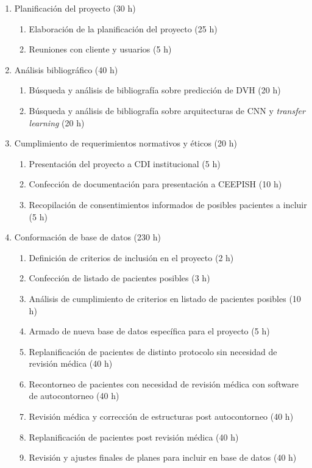 \documentclass[
11pt, %
codirector, %
]{charter}
\begin{document}
\begin{enumerate}
\item Planificación del proyecto (30 h)
	\begin{enumerate}
	\item Elaboración de la planificación del proyecto (25 h)
	\item Reuniones con cliente y usuarios (5 h)
	\end{enumerate}
\item Análisis bibliográfico (40 h)
	\begin{enumerate}
	\item Búsqueda y análisis de bibliografía sobre predicción de DVH (20 h)
	\item Búsqueda y análisis de bibliografía sobre arquitecturas de CNN y \textit{transfer learning} (20 h)
	\end{enumerate}
\item Cumplimiento de requerimientos normativos y éticos (20 h)
	\begin{enumerate}
	\item Presentación del proyecto a CDI institucional (5 h)
	\item Confección de documentación para presentación a CEEPISH (10 h)
	\item Recopilación de consentimientos informados de posibles pacientes a incluir (5 h)
	\end{enumerate}
\item Conformación de base de datos (230 h)
	\begin{enumerate}
	\item Definición de criterios de inclusión en el proyecto (2 h)
	\item Confección de listado de pacientes posibles (3 h)
	\item Análisis de cumplimiento de criterios en listado de pacientes posibles (10 h)
	\item Armado de nueva base de datos específica para el proyecto (5 h)
	\item Replanificación de pacientes de distinto protocolo sin necesidad de revisión médica (40 h)
	\item Recontorneo de pacientes con necesidad de revisión médica con software de autocontorneo (40 h)
	\item Revisión médica y corrección de estructuras post autocontorneo (40 h)
	\item Replanificación de pacientes post revisión médica (40 h)
	\item Revisión y ajustes finales de planes para incluir en base de datos (40 h)

\end{enumerate}
\end{enumerate}
\end{document}
